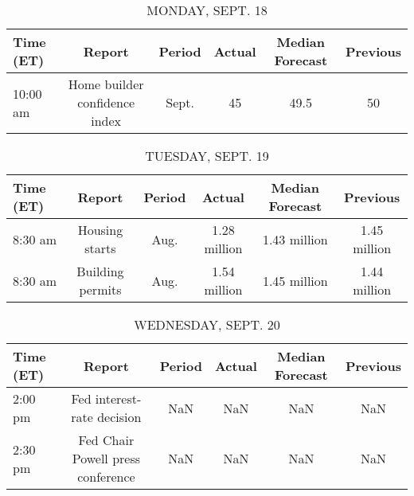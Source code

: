 \documentclass{article}%
\begin{document}
%
\normalsize%


\begin{table}[htbp]%
\caption{MONDAY, SEPT. 18}%
\centering%
\begin{adjustbox}{width=1\textwidth}%
\begin{tabular}{lccccc}
\toprule
Time (ET) &                        Report & Period & Actual & Median Forecast & Previous \\
\midrule
 10:00 am & Home builder confidence index &  Sept. &     45 &            49.5 &       50 \\
\bottomrule
\end{tabular}
%
\end{adjustbox}%
\end{table}

%


\begin{table}[htbp]%
\caption{TUESDAY, SEPT. 19}%
\centering%
\begin{adjustbox}{width=1\textwidth}%
\begin{tabular}{lccccc}
\toprule
Time (ET) &           Report & Period &       Actual & Median Forecast &     Previous \\
\midrule
  8:30 am &   Housing starts &   Aug. & 1.28 million &    1.43 million & 1.45 million \\
  8:30 am & Building permits &   Aug. & 1.54 million &    1.45 million & 1.44 million \\
\bottomrule
\end{tabular}
%
\end{adjustbox}%
\end{table}

%


\begin{table}[htbp]%
\caption{WEDNESDAY, SEPT. 20}%
\centering%
\begin{adjustbox}{width=1\textwidth}%
\begin{tabular}{lccccc}
\toprule
Time (ET) &                            Report & Period & Actual & Median Forecast & Previous \\
\midrule
  2:00 pm &        Fed interest-rate decision &    NaN &    NaN &             NaN &      NaN \\
  2:30 pm & Fed Chair Powell press conference &    NaN &    NaN &             NaN &      NaN \\
\bottomrule
\end{tabular}
%
\end{adjustbox}%
\end{table}
\end{document}
